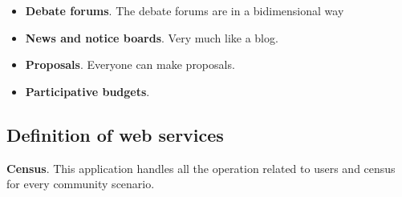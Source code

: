 \documentclass[12pt,a4paper]{article}
\begin{document}
\begin{itemize}
\item {\bf Debate forums}. The debate forums are in a bidimensional way
\item {\bf News and notice boards}. Very much like a blog.
\item {\bf Proposals}. Everyone can make proposals.
\item {\bf Participative budgets}.
\end{itemize}

\subsection{Definition of web services}

{\bf Census}. This application handles all the operation related to users and census for every community scenario.
\end{document}
